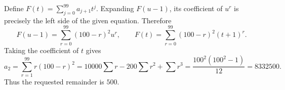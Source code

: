 Define $F(t)=\sum_{j=0}^{99}a_{j+1}t^j$. Expanding $F(u-1)$, its coefficient of $u^r$ is precisely the left side of the given equation. Therefore
\[
F(u-1)=\sum_{r=0}^{99}(100-r)^2u^r,
\qquad
F(t)=\sum_{r=0}^{99}(100-r)^2(t+1)^r.
\]
Taking the coefficient of $t$ gives
\[
a_2=\sum_{r=1}^{99}r(100-r)^2
=10000\sum r-200\sum r^2+\sum r^3
=\dfrac{100^2(100^2-1)}{12}=8332500.
\]
Thus the requested remainder is $\boxed{500}$.
